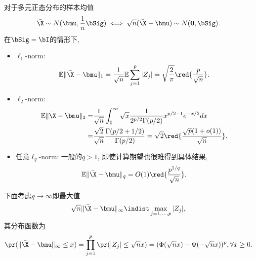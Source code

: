 对于多元正态分布的样本均值
\begin{align*}
	\bar{\X} \sim N(\bmu, \frac{1}{n}\bSig) \iff \sqrt{n} (\bar{\X}-\bmu)\sim N(\bf{0}, \bSig).
\end{align*}	
在$\bSig=\bI$的情形下, 	
\begin{itemize}
	\item  $\ell_1$-norm:
	\begin{align*}
		\E \|\bar{\X}-\bmu\|_1=\frac{1}{\sqrt{n}} \E \sum_{j=1}^p |Z_j|= \sqrt{\frac{2}{\pi}} \red{\frac{p}{\sqrt{n}}}.
	\end{align*}
	\item  $\ell_2$-norm:
	\begin{align*}
		\E \|\bar{\X}-\bmu\|_2=&\frac{1}{\sqrt{n}} \int_0^\infty \sqrt{x}  \frac{1}{2^{p/2} \Gamma(p/2)} x^{p/2-1}e^{-x/2}dx\\
		=&\frac{\sqrt{2}}{\sqrt{n}} \frac{\Gamma(p/2+1/2)}{\Gamma(p/2)}=\sqrt{2} \red{\frac{\sqrt{p}(1+o(1))}{\sqrt{n}}}.
	\end{align*}
	\item 任意$\ell_q$-norm: 一般的$q>1$, 即使计算期望也很难得到具体结果, 
	\begin{align*}
		\E \|\bar{\X}-\bmu\|_q=O(1) \red{\frac{p^{1/q}}{\sqrt{n}}}.
	\end{align*} 
\end{itemize}

下面考虑$q \to \infty$即最大值	
\begin{align*}
	\sqrt{n} \|\bar{\X}-\bmu\|_\infty\indist \max_{j=1,\ldots,p} |Z_j|,
\end{align*}	
其分布函数为
\begin{align*}
	\pr(\|\bar{\X}-\bmu\|_\infty \leq x)=\prod_{j=1}^p \pr(|Z_j|\leq \sqrt{n} x)=(\Phi(\sqrt{n} x)-\Phi(-\sqrt{n} x))^p, \forall x \geq 0.
\end{align*}




